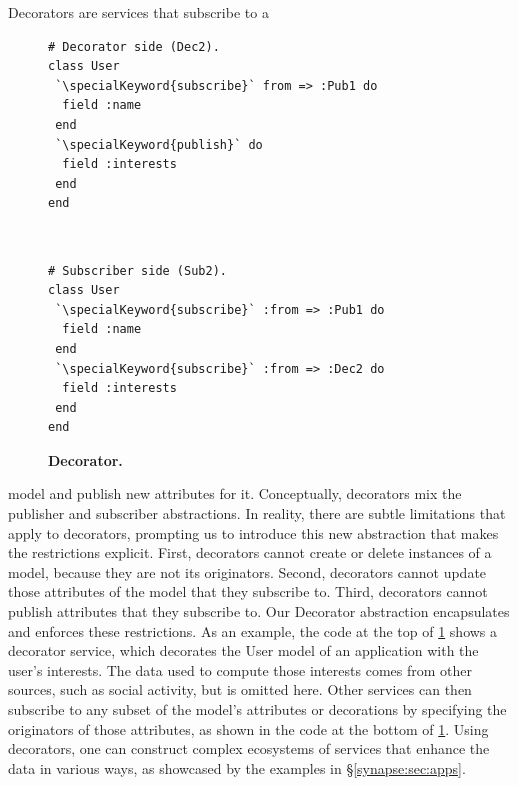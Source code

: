 Decorators are services that subscribe to a
\begin{figure}
\vspace{-0.2cm}
\begin{minipage}{.2\textwidth}
\begin{lstlisting}[xleftmargin=2pt,framexleftmargin=2pt]
# Decorator side (Dec2).
class User
 `\specialKeyword{subscribe}` from => :Pub1 do
  field :name
 end
 `\specialKeyword{publish}` do
  field :interests
 end
end
\end{lstlisting}
\end{minipage}\vspace{-9pt}\\
\noindent
\begin{minipage}{.2\textwidth}
\begin{lstlisting}[xleftmargin=2pt,framexleftmargin=2pt]
# Subscriber side (Sub2).
class User
 `\specialKeyword{subscribe}` :from => :Pub1 do
  field :name
 end
 `\specialKeyword{subscribe}` :from => :Dec2 do
  field :interests
 end
end
\end{lstlisting}
\end{minipage}
\vspace{-0.5cm}
\caption{{\footnotesize {\bf Decorator.}}}
\label{synapse:fig:deco}
\vspace{-10pt}
\end{figure}
\noindent
model and publish new attributes for it.  Conceptually, decorators mix the
publisher and subscriber abstractions.  In  reality, there are subtle
limitations that apply to decorators, prompting us to introduce this new
abstraction that makes the
restrictions explicit.  First, decorators cannot create or delete instances
of a model, because they are not its originators.  Second,
decorators cannot update those attributes of the model that they subscribe
to.  Third, decorators cannot publish attributes that they subscribe to.
Our Decorator abstraction encapsulates and enforces these restrictions.
As an example, the code at the top of \F\ref{synapse:fig:deco} shows a decorator
service, which decorates the User model of an application with the user's
interests.  The data used to compute those interests comes from other sources,
such as social activity, but is omitted here. Other services can then subscribe
to any subset of the model's attributes or decorations by specifying the
originators of those attributes, as shown in the code at the bottom of \F\ref{synapse:fig:deco}.
Using decorators, one can construct complex ecosystems of services
that enhance the data in various ways, as showcased by the examples in
\S\ref{synapse:sec:apps}.

